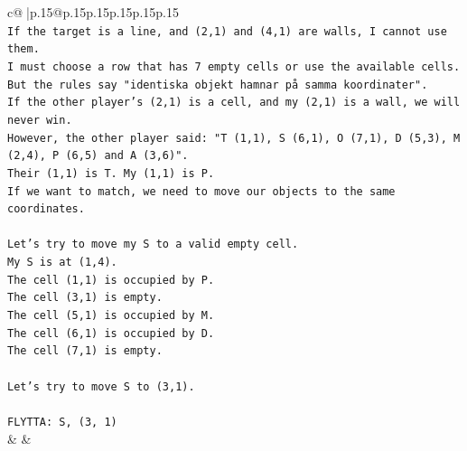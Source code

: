 \documentclass{article}
\begin{document}
{\begin{supertabular}{c@{$\;$}|p{.15\linewidth}@{}p{.15\linewidth}p{.15\linewidth}p{.15\linewidth}p{.15\linewidth}p{.15\linewidth}}
{{{\\ 
\texttt{If the target is a line, and (2,1) and (4,1) are walls, I cannot use them.} \\
\texttt{I must choose a row that has 7 empty cells or use the available cells.} \\
\texttt{But the rules say "identiska objekt hamnar på samma koordinater".} \\
\texttt{If the other player's (2,1) is a cell, and my (2,1) is a wall, we will never win.} \\
\texttt{However, the other player said: "T (1,1), S (6,1), O (7,1), D (5,3), M (2,4), P (6,5) and A (3,6)".} \\
\texttt{Their (1,1) is T. My (1,1) is P.} \\
\texttt{If we want to match, we need to move our objects to the same coordinates.} \\
\\ 
\texttt{Let's try to move my S to a valid empty cell.} \\
\texttt{My S is at (1,4).} \\
\texttt{The cell (1,1) is occupied by P.} \\
\texttt{The cell (3,1) is empty.} \\
\texttt{The cell (5,1) is occupied by M.} \\
\texttt{The cell (6,1) is occupied by D.} \\
\texttt{The cell (7,1) is empty.} \\
\\ 
\texttt{Let's try to move S to (3,1).} \\
\\ 
\texttt{FLYTTA: S, (3, 1)} \\
            }
        }
    }
    & & \\ \\


\end{supertabular}}
\end{document}
